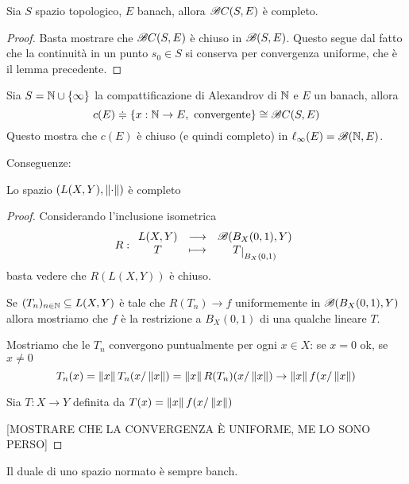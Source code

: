 \begin{proposition}
Sia $S$ spazio topologico, $E$ banach, allora $\mathscr{B} C(S,E)$ \`e completo.
\end{proposition}
\begin{proof}
Basta mostrare che $\mathscr{B} C(S,E)$ \`e chiuso in $\mathscr{B}(S,E)$. Questo segue dal fatto che la continuit\`a in un punto $s_0\in S$ si conserva per convergenza uniforme, che \`e il lemma precedente.
\end{proof}

\begin{example}
Sia $S=\mathbb{N}\cup\left\{{\infty}\right\}$ la compattificazione di Alexandrov di $\mathbb{N}$ e $E$ un banach, allora
\[c(E)\doteqdot\left\{{x:\mathbb{N}\to E,\text{ convergente}}\right\}\cong \mathscr{B} C(S,E)\]
Questo mostra che $c(E)$ \`e chiuso (e quindi completo) in $\ell_\infty(E)=\mathscr{B}(\mathbb{N},E)$.
\end{example}


Conseguenze:
\begin{proposition}
Lo spazio $(L(X,Y),\left\Vert{\cdot}\right\Vert)$ \`e completo
\end{proposition}
\begin{proof}
Considerando l'inclusione isometrica 
\[R:\funcDef{L(X,Y)}{\Bs(B_X(0,1),Y)}{T}{T\res{B_X(0,1)}}\]
basta vedere che $R(L(X,Y))$ \`e chiuso.

Se $(T_n)_{n\in\mathbb{N}}\subseteq L(X,Y)$ \`e tale che $R(T_n)\to f$ uniformemente in $\mathscr{B}(B_X(0,1),Y)$ allora mostriamo che $f$ \`e la restrizione a $B_X(0,1)$ di una qualche lineare $T$.

Mostriamo che le $T_n$ convergono puntualmente per ogni $x\in X$: se $x=0$ ok, se $x\neq 0$
\[T_n(x)=\left\Vert{x}\right\Vert T_n(x/\left\Vert{x}\right\Vert)=\left\Vert{x}\right\Vert R(T_n)(x/\left\Vert{x}\right\Vert)\to \left\Vert{x}\right\Vert f(x/\left\Vert{x}\right\Vert)\]

Sia $T:X\to Y$ definita da $T(x)=\left\Vert{x}\right\Vert f(x/\left\Vert{x}\right\Vert)$

[MOSTRARE CHE LA CONVERGENZA \`E UNIFORME, ME LO SONO PERSO]
\end{proof}

\begin{corollary}\label{CorDualeNormatoEBanach}
Il duale di uno spazio normato \`e sempre banch.
\end{corollary}


